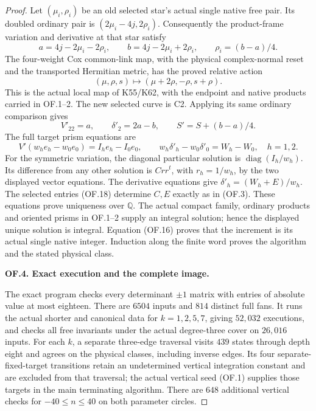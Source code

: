 \begin{proof}
Let \((\mu_i,\rho_i)\) be an old selected star's actual
single native free pair. Its doubled ordinary pair is
\((2\mu_i-4j,2\rho_i)\). Consequently the product-frame
variation and derivative at that star satisfy
\[
 a=4j-2\mu_i-2\rho_i,\qquad
 b=4j-2\mu_i+2\rho_i,\qquad \rho_i=(b-a)/4.
 \tag{OF.16}
\]
The four-weight Cox common-link map, with the physical
complex-normal reset and the transported Hermitian metric,
has the proved relative action
\[
             (\mu,\rho,s)\longmapsto(\mu+2\rho,-\rho,s+\rho).
 \tag{OF.17}
\]
This is the actual local map of K55/K62, with the endpoint
and native products carried in OF.1--2. The new selected
curve is C2. Applying its same ordinary comparison gives
\[
              V'_{22}=a,\qquad \delta'_2=2a-b,\qquad
              S'=S+(b-a)/4.                          \tag{OF.18}
\]
The full target prism equations are
\[
 V'(w_he_h-w_0e_0)=I_he_h-I_0e_0,
 \qquad w_h\delta'_h-w_0\delta'_0=W_h-W_0,
 \quad h=1,2.                                       \tag{OF.19}
\]
For the symmetric variation, the diagonal particular solution
is \(\operatorname{diag}(I_h/w_h)\). Its difference from any
other solution is \(Crr^t\), with \(r_h=1/w_h\), by the
two displayed vector equations. The derivative equations
give \(\delta'_h=(W_h+E)/w_h\). The selected entries
(OF.18) determine \(C,E\) exactly as in (OF.3).
These equations prove uniqueness over \(\mathbb Q\).
The actual compact family, ordinary products and oriented
prisms in OF.1--2 supply an integral solution; hence the
displayed unique solution is integral. Equation (OF.16)
proves that the increment is its actual single native
integer. Induction along the finite word proves the
algorithm and the stated physical class.

\par\medskip\noindent\textbf{OF.4. Exact execution and the complete image.}\par\nopagebreak[4]
The exact program 
checks every determinant \(\pm1\) matrix with entries
of absolute value at most eighteen. There are \(6504\)
inputs and \(814\) distinct full fans. It runs the actual
shorter and canonical data for \(k=1,2,5,7\), giving
\(52{,}032\) executions, and checks all free invariants
under the actual degree-three cover on \(26{,}016\)
inputs. For each \(k\), a separate three-edge traversal
visits \(439\) states through depth eight and agrees on
the physical classes, including inverse edges. Its four
separate-fixed-target transitions retain an undetermined
vertical integration constant and are excluded from that
traversal; the actual vertical seed (OF.1) supplies those
targets in the main terminating algorithm. There are
\(648\) additional vertical checks for \(-40\le n\le40\)
on both parameter circles.


\end{proof}

